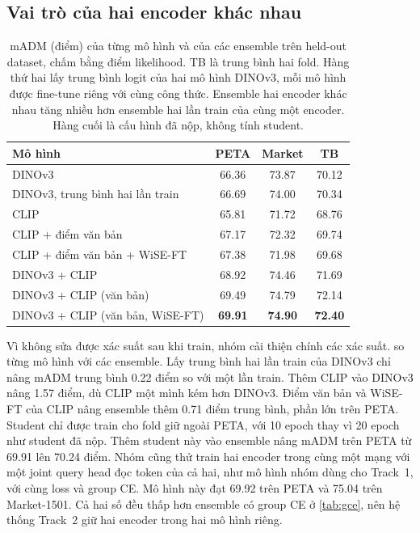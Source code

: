 \documentclass[10pt,twocolumn,letterpaper]{article}
\begin{document}
\subsection{Vai trò của hai encoder khác nhau}
\label{sec:enc}

\begin{table}[t]
\centering
\small
\setlength{\tabcolsep}{4pt}
\begin{tabular}{@{}lccc@{}}
\toprule
Mô hình & PETA & Market & TB \\
\midrule
DINOv3 & 66.36 & 73.87 & 70.12 \\
DINOv3, trung bình hai lần train & 66.69 & 74.00 & 70.34 \\
CLIP & 65.81 & 71.72 & 68.76 \\
CLIP + điểm văn bản & 67.17 & 72.32 & 69.74 \\
CLIP + điểm văn bản + WiSE-FT & 67.38 & 71.98 & 69.68 \\
\midrule
DINOv3 + CLIP & 68.92 & 74.46 & 71.69 \\
DINOv3 + CLIP (văn bản) & 69.49 & 74.79 & 72.14 \\
DINOv3 + CLIP (văn bản, WiSE-FT) & \textbf{69.91} & \textbf{74.90} & \textbf{72.40} \\
\bottomrule
\end{tabular}
\caption{mADM (điểm) của từng mô hình và của các ensemble trên held-out dataset, chấm bằng điểm likelihood. TB là trung bình hai fold. Hàng thứ hai lấy trung bình logit của hai mô hình DINOv3, mỗi mô hình được fine-tune riêng với cùng công thức. Ensemble hai encoder khác nhau tăng nhiều hơn ensemble hai lần train của cùng một encoder. Hàng cuối là cấu hình đã nộp, không tính student.}
\label{tab:enc}
\end{table}

Vì không sửa được xác suất sau khi train, nhóm cải thiện chính các xác suất.  so từng mô hình với các ensemble. Lấy trung bình hai lần train của DINOv3 chỉ nâng mADM trung bình 0.22 điểm so với một lần train. Thêm CLIP vào DINOv3 nâng 1.57 điểm, dù CLIP một mình kém hơn DINOv3. Điểm văn bản và WiSE-FT của CLIP nâng ensemble thêm 0.71 điểm trung bình, phần lớn trên PETA. Student chỉ được train cho fold giữ ngoài PETA, với 10 epoch thay vì 20 epoch như student đã nộp. Thêm student này vào ensemble nâng mADM trên PETA từ 69.91 lên 70.24 điểm. Nhóm cũng thử train hai encoder trong cùng một mạng với một joint query head đọc token của cả hai, như mô hình nhóm dùng cho Track~1, với cùng loss và group CE. Mô hình này đạt 69.92 trên PETA và 75.04 trên Market-1501. Cả hai số đều thấp hơn ensemble có group CE ở \cref{tab:gce}, nên hệ thống Track~2 giữ hai encoder trong hai mô hình riêng.
\end{document}
